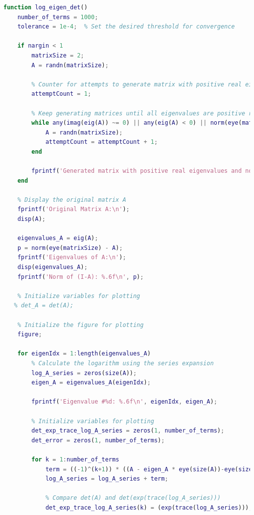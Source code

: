 \begin{sourcecode}
\label{sourcecode-matrix-inverse}  
    \begin{lstlisting}[language=MATLAB, caption=finding determinant equation using eigen value]function log_eigen_det()
    number_of_terms = 1000;
    tolerance = 1e-4;  % Set the desired threshold for convergence
    
    if nargin < 1
        matrixSize = 2;
        A = randn(matrixSize);

        % Counter for attempts to generate matrix with positive real eigenvalues
        attemptCount = 1;

        % Keep generating matrices until all eigenvalues are positive real numbers
        while any(imag(eig(A)) ~= 0) || any(eig(A) < 0) || norm(eye(matrixSize) - A) > 1
            A = randn(matrixSize);
            attemptCount = attemptCount + 1;
        end

        fprintf('Generated matrix with positive real eigenvalues and norm(identity - A) < 1 after %d attempts.\n', attemptCount);
    end
    
    % Display the original matrix A
    fprintf('Original Matrix A:\n');
    disp(A);
    
    eigenvalues_A = eig(A);
    p = norm(eye(matrixSize) - A);
    fprintf('Eigenvalues of A:\n');
    disp(eigenvalues_A);
    fprintf('Norm of (I-A): %.6f\n', p);

    % Initialize variables for plotting
   % det_A = det(A);
    
    % Initialize the figure for plotting
    figure;
    
    for eigenIdx = 1:length(eigenvalues_A)
        % Calculate the logarithm using the series expansion
        log_A_series = zeros(size(A));
        eigen_A = eigenvalues_A(eigenIdx);
        
        fprintf('Eigenvalue #%d: %.6f\n', eigenIdx, eigen_A);

        % Initialize variables for plotting
        det_exp_trace_log_A_series = zeros(1, number_of_terms);
        det_error = zeros(1, number_of_terms);

        for k = 1:number_of_terms
            term = ((-1)^(k+1)) * ((A - eigen_A * eye(size(A))-eye(size(A)))^k) / k;
            log_A_series = log_A_series + term;

            % Compare det(A) and det(exp(trace(log_A_series)))
            det_exp_trace_log_A_series(k) = (exp(trace(log_A_series)));


\end{lstlisting}
\end{sourcecode}
